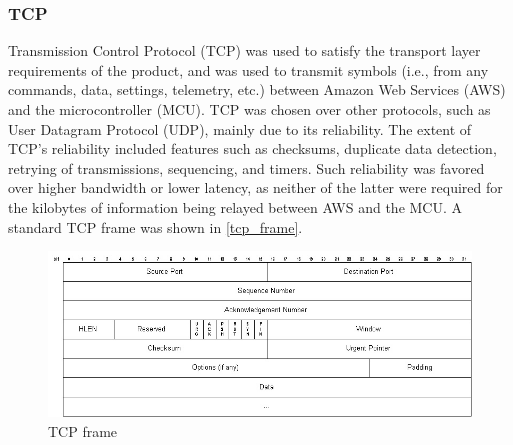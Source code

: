 \subsubsection{TCP} \label{tcp_standard} 
Transmission Control Protocol (TCP) was used to satisfy the transport layer requirements of the product, and was used to transmit symbols (i.e., from any commands, data, settings, telemetry, etc.) between Amazon Web Services (AWS) and the microcontroller (MCU). TCP was chosen over other protocols, such as User Datagram Protocol (UDP), mainly due to its reliability. The extent of TCP's reliability included features such as checksums, duplicate data detection, retrying of transmissions, sequencing, and timers. Such reliability was favored over higher bandwidth or lower latency, as neither of the latter were required for the kilobytes of information being relayed between AWS and the MCU. A standard TCP frame was shown in \autoref{tcp_frame}.
\begin{figure}[H]
    \caption{TCP frame \cite{Kristoff}}
    \label{tcp_frame}
    \centering
    \includegraphics[width=\textwidth]{images/tcp_frame.jpg}
\end{figure}


